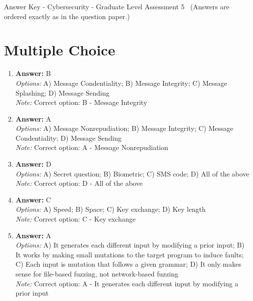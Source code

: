 \documentclass[12pt]{article}
\begin{document}
\begin{center}
Answer Key - Cybersecurity - Graduate Level Assessment 5 \
\small (Answers are ordered exactly as in the question paper.)
\end{center}

\section*{Multiple Choice}
\begin{enumerate}[label=\arabic*.]
\item \textbf{Answer:} B
\\ \textit{Options:} A) Message Condentiality; B) Message Integrity; C) Message Splashing; D) Message Sending
\\ \textit{Note:} Correct option: B - Message Integrity
\item \textbf{Answer:} A
\\ \textit{Options:} A) Message Nonrepudiation; B) Message Integrity; C) Message Condentiality; D) Message Sending
\\ \textit{Note:} Correct option: A - Message Nonrepudiation
\item \textbf{Answer:} D
\\ \textit{Options:} A) Secret question; B) Biometric; C) SMS code; D) All of the above
\\ \textit{Note:} Correct option: D - All of the above
\item \textbf{Answer:} C
\\ \textit{Options:} A) Speed; B) Space; C) Key exchange; D) Key length
\\ \textit{Note:} Correct option: C - Key exchange
\item \textbf{Answer:} A
\\ \textit{Options:} A) It generates each different input by modifying a prior input; B) It works by making small mutations to the target program to induce faults; C) Each input is mutation that follows a given grammar; D) It only makes sense for file-based fuzzing, not network-based fuzzing
\\ \textit{Note:} Correct option: A - It generates each different input by modifying a prior input
\end{enumerate}
\end{document}
